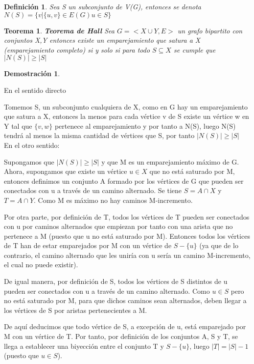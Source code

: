 \documentclass[a4paper,1pt]{report}
\newtheorem*{teo}{Teorema}
\newtheorem*{dem}{Demostración}
\newtheorem*{dfn}{Definición}
\begin{document}
\begin{dfn}
 Sea S un subconjunto de V(G), entonces se denota $N(S)=\{v|\{u,v\} \in E(G) u\in S\}$
\end{dfn}

\begin{teo}
 \textbf{Teorema de Hall} Sea $G=<X\cup Y, E>$ un grafo bipartito con conjuntos X,Y entonces existe un emparejamiento que satura a X (emparejamiento completo) si y solo si para todo $S\subseteq X$ se cumple que $|N(S)|\geq |S|$
\end{teo}

\begin{dem}
 
\end{dem}


En el sentido directo

Tomemos S, un subconjunto cualquiera de X, como en G hay un emparejamiento que satura a X, entonces la menos para cada vértice v de S existe un vértice w en Y tal que $\{v,w\}$ pertenece al emparejamiento y por tanto a N(S), luego N(S) tendrá al menos la misma cantidad de vértices que S, por tanto $|N(S)|\geq |S|$\\


En el otro sentido:

Supongamos que $|N(S)|\geq |S|$ y que M es un emparejamiento máximo de G. Ahora, supongamos que existe un vértice $u\in X$ que no está saturado por M, entonces definimos un conjunto A formado por los vértices de G que pueden ser conectados con u a través de un camino alternado. Se tiene $S=A\cap X$ y $T=A\cap Y$. Como M es máximo no hay caminos M-incremento. 

Por otra parte, por definición de T, todos los vértices de T pueden ser conectados con u por caminos alternados que empiezan por tanto con una arista que no pertenece a M (puesto que u no está saturado por M). Entonces todos los vértices de T han de estar emparejados por M con un vértice de $S- \{u\}$ (ya que de lo contrario, el camino alternado que les uniría con u sería un camino M-incremento, el cual no puede existir).

De igual manera, por definición de S, todos los vértices de S distintos de u pueden ser conectados con u a través de un camino alternado.  Como $u\in S$ pero no está saturado por M, para que dichos caminos sean alternados, deben llegar a los vértices de S por aristas pertenecientes a M.

De aquí deducimos que todo vértice de S, a excepción de u, está emparejado por M con un vértice de T. Por tanto, por definición de los conjuntos A, S y T, se llega a establecer una biyección entre el conjunto T y $S-\{ u \}$, luego $|T| = |S| - 1$ (puesto que $u \in S$).
\end{document}
